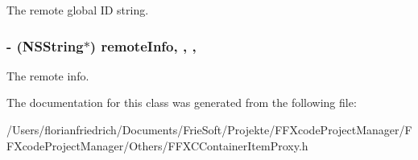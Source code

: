 The remote global I\-D string. \hypertarget{interface_f_f_x_c_container_item_proxy_a5f8444241e9c286600c6ca079658a38f}{
\subsubsection[{remote\-Info}]{\setlength{\rightskip}{0pt plus 5cm}-\/ (N\-S\-String$\ast$) remote\-Info\hspace{0.3cm}{\ttfamily [read]}, {\ttfamily [write]}, {\ttfamily [nonatomic]}, {\ttfamily [strong]}}}\label{interface_f_f_x_c_container_item_proxy_a5f8444241e9c286600c6ca079658a38f}
The remote info. 

The documentation for this class was generated from the following file\-:\begin{DoxyCompactItemize}
\item 
/\-Users/florianfriedrich/\-Documents/\-Frie\-Soft/\-Projekte/\-F\-F\-Xcode\-Project\-Manager/\-F\-F\-Xcode\-Project\-Manager/\-Others/F\-F\-X\-C\-Container\-Item\-Proxy.\-h\end{DoxyCompactItemize}
